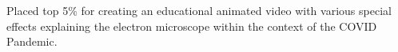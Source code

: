 \documentclass[]{main}
\begin{document}
\begin{minipage}[t]{0.66\textwidth}
Placed top 5\% for creating an educational animated video with various special effects explaining the electron microscope within the context of the COVID Pandemic.
\sectionsep


\sectionsep



\end{minipage} 
\end{document}
